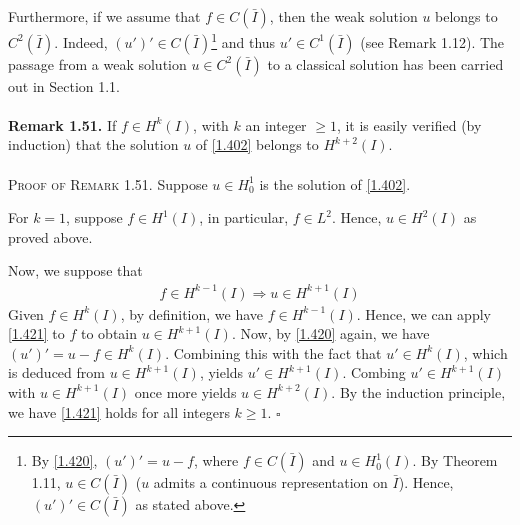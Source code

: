 \documentclass[a4paper,oneside]{book}
\numberwithin{equation}{chapter}
\begin{document}
Furthermore, if we assume that $f\in C\left(\bar I\right)$, then the weak solution $u$ belongs to $C^2\left(\bar I\right)$. Indeed, $\left(u'\right)'\in C\left(\bar I\right)$\footnote{By \eqref{1.420}, $\left(u'\right)'=u-f$, where $f\in C\left(\bar I\right)$ and $u\in H_0^1\left(I\right)$. By Theorem 1.11, $u\in C\left(\bar I\right)$ ($u$ admits a continuous representation on $\bar I$). Hence, $\left(u'\right)'\in C\left(\bar I\right)$ as stated above.} and thus $u'\in C^1\left(\bar I\right)$ (see Remark 1.12). The passage from a weak solution $u\in C^2\left(\bar I\right)$ to a classical solution has been carried out in Section 1.1.\\
\\
\textbf{Remark 1.51.} If $f\in H^k\left(I\right)$, with $k$ an integer $\ge 1$, it is easily verified (by induction) that the solution $u$ of \eqref{1.402} belongs to $H^{k+2}\left(I\right)$.\\
\\
\textsc{Proof of Remark 1.51.} Suppose $u\in H_0^1$ is the solution of \eqref{1.402}. 

For $k=1$, suppose $f\in H^1\left(I\right)$, in particular, $f\in L^2$. Hence, $u\in H^2\left(I\right)$ as proved above. 

Now, we suppose that 
\begin{align}
\label{1.421}
f \in {H^{k - 1}}\left( I \right) \Rightarrow u \in {H^{k + 1}}\left( I \right)
\end{align}
Given $f\in H^k\left(I\right)$, by definition, we have $f\in H^{k-1}\left(I\right)$. Hence, we can apply \eqref{1.421} to $f$ to obtain $u\in H^{k+1}\left(I\right)$. Now, by \eqref{1.420} again, we have $\left( {u'} \right)' = u - f \in {H^k}\left( I \right)$. Combining this with the fact that $u'\in H^k\left(I\right)$, which is deduced from $u\in H^{k+1}\left(I\right)$, yields $u'\in H^{k+1}\left(I\right)$. Combing $u'\in H^{k+1} \left(I\right)$ with $u\in H^{k+1}\left(I\right)$ once more yields $u\in H^{k+2}\left(I\right)$. By the induction principle, we have \eqref{1.421} holds for all integers $k\ge 1$. \hfill $\square$\\
\end{document}
